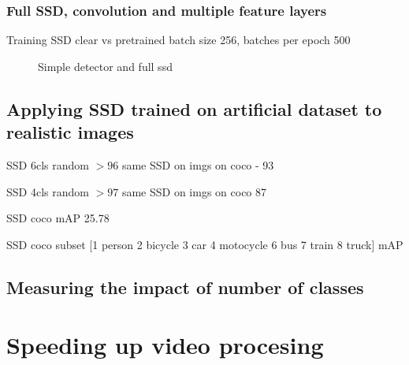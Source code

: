 \subsubsection{Full SSD, convolution and multiple feature layers}
Training SSD clear vs pretrained
batch size 256, batches per epoch 500

\begin{figure}
    \label{fig:resnetSSD}
    \resnetSSD
    \caption{Simple detector and full ssd }
\end{figure}


\subsection{Applying SSD trained on artificial dataset to realistic images}
SSD 6cls random $>96$
same SSD on imgs on coco - 93

SSD 4cls random $>97$
same SSD on imgs on coco 87


SSD coco mAP 25.78

SSD coco subset [1 person
2 bicycle
3 car
4 motocycle
6 bus
7 train
8 truck] mAP

\subsection{Measuring the impact of number of classes}

\section{Speeding up video procesing}